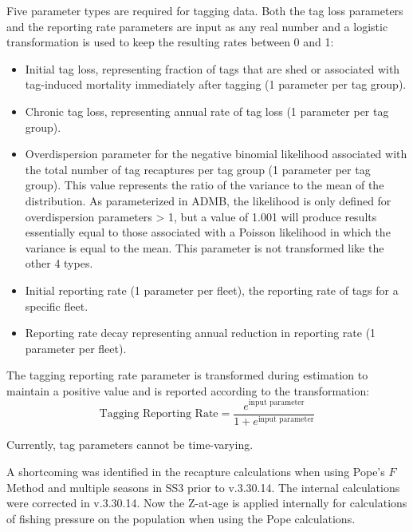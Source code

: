 Five parameter types are required for tagging data. Both the tag loss parameters and the reporting rate parameters are input as any real number and a logistic transformation is used to keep the resulting rates between 0 and 1:
\begin{itemize}
	\item Initial tag loss, representing fraction of tags that are shed or associated with tag-induced mortality immediately after tagging (1 parameter per tag group). 
	\item Chronic tag loss, representing annual rate of tag loss (1 parameter per tag group).
	\item Overdispersion parameter for the negative binomial likelihood associated with the total number of tag recaptures per tag group (1 parameter per tag group). This value represents the ratio of the variance to the mean of the distribution. As parameterized in ADMB, the likelihood is only defined for overdispersion parameters > 1, but a value of 1.001 will produce results essentially equal to those associated with a Poisson likelihood in which the variance is equal to the mean. This parameter is not transformed like the other 4 types.
	\item Initial reporting rate (1 parameter per fleet), the reporting rate of tags for a specific fleet.
	\item Reporting rate decay representing annual reduction in reporting rate (1 parameter per fleet).
\end{itemize}

The tagging reporting rate parameter is transformed during estimation to maintain a positive value and is reported according to the transformation:
\begin{equation}
	\text{Tagging Reporting Rate} = \frac{e^{\text{input parameter}}}{1+e^{\text{input parameter}}}
\end{equation}

Currently, tag parameters cannot be time-varying.

A shortcoming was identified in the recapture calculations when using Pope's $F$ Method and multiple seasons in SS3 prior to v.3.30.14. The internal calculations were corrected in v.3.30.14. Now the Z-at-age is applied internally for calculations of fishing pressure on the population when using the Pope calculations.

